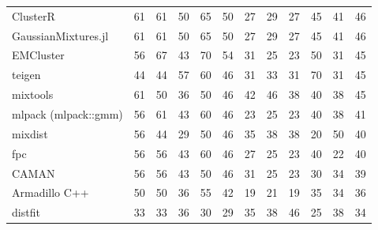 \documentclass[10pt,a4paper]{article}
\begin{document}
{\begin{longtable}{@{}l *{11}{r}@{}}
ClusterR & \cellcolor{hm!48}61 & \cellcolor{hm!48}61 & \cellcolor{hm!40}50 & \cellcolor{hm!50}65 & \cellcolor{hm!40}50 & \cellcolor{hm!24}27 & \cellcolor{hm!25}29 & \cellcolor{hm!24}27 & \cellcolor{hm!36}45 & \cellcolor{hm!33}41 & \cellcolor{hm!37}46 \\
GaussianMixtures.jl & \cellcolor{hm!48}61 & \cellcolor{hm!48}61 & \cellcolor{hm!40}50 & \cellcolor{hm!50}65 & \cellcolor{hm!40}50 & \cellcolor{hm!24}27 & \cellcolor{hm!25}29 & \cellcolor{hm!24}27 & \cellcolor{hm!36}45 & \cellcolor{hm!33}41 & \cellcolor{hm!37}46 \\
EMCluster & \cellcolor{hm!44}56 & \cellcolor{hm!52}67 & \cellcolor{hm!35}43 & \cellcolor{hm!54}70 & \cellcolor{hm!43}54 & \cellcolor{hm!27}31 & \cellcolor{hm!22}25 & \cellcolor{hm!21}23 & \cellcolor{hm!40}50 & \cellcolor{hm!27}31 & \cellcolor{hm!36}45 \\
teigen & \cellcolor{hm!36}44 & \cellcolor{hm!36}44 & \cellcolor{hm!45}57 & \cellcolor{hm!47}60 & \cellcolor{hm!37}46 & \cellcolor{hm!27}31 & \cellcolor{hm!28}33 & \cellcolor{hm!27}31 & \cellcolor{hm!54}70 & \cellcolor{hm!27}31 & \cellcolor{hm!36}45 \\
mixtools & \cellcolor{hm!48}61 & \cellcolor{hm!40}50 & \cellcolor{hm!30}36 & \cellcolor{hm!40}50 & \cellcolor{hm!37}46 & \cellcolor{hm!35}42 & \cellcolor{hm!37}46 & \cellcolor{hm!32}38 & \cellcolor{hm!33}40 & \cellcolor{hm!31}38 & \cellcolor{hm!36}45 \\
mlpack (mlpack::gmm) & \cellcolor{hm!44}56 & \cellcolor{hm!48}61 & \cellcolor{hm!35}43 & \cellcolor{hm!47}60 & \cellcolor{hm!37}46 & \cellcolor{hm!21}23 & \cellcolor{hm!22}25 & \cellcolor{hm!21}23 & \cellcolor{hm!33}40 & \cellcolor{hm!31}38 & \cellcolor{hm!34}41 \\
mixdist & \cellcolor{hm!44}56 & \cellcolor{hm!36}44 & \cellcolor{hm!25}29 & \cellcolor{hm!40}50 & \cellcolor{hm!37}46 & \cellcolor{hm!29}35 & \cellcolor{hm!31}38 & \cellcolor{hm!32}38 & \cellcolor{hm!19}20 & \cellcolor{hm!40}50 & \cellcolor{hm!33}40 \\
fpc & \cellcolor{hm!44}56 & \cellcolor{hm!44}56 & \cellcolor{hm!35}43 & \cellcolor{hm!47}60 & \cellcolor{hm!37}46 & \cellcolor{hm!24}27 & \cellcolor{hm!22}25 & \cellcolor{hm!21}23 & \cellcolor{hm!33}40 & \cellcolor{hm!20}22 & \cellcolor{hm!33}40 \\
CAMAN & \cellcolor{hm!44}56 & \cellcolor{hm!44}56 & \cellcolor{hm!35}43 & \cellcolor{hm!40}50 & \cellcolor{hm!37}46 & \cellcolor{hm!27}31 & \cellcolor{hm!22}25 & \cellcolor{hm!21}23 & \cellcolor{hm!26}30 & \cellcolor{hm!29}34 & \cellcolor{hm!33}39 \\
Armadillo C++ & \cellcolor{hm!40}50 & \cellcolor{hm!40}50 & \cellcolor{hm!30}36 & \cellcolor{hm!44}55 & \cellcolor{hm!34}42 & \cellcolor{hm!18}19 & \cellcolor{hm!20}21 & \cellcolor{hm!18}19 & \cellcolor{hm!30}35 & \cellcolor{hm!29}34 & \cellcolor{hm!30}36 \\
distfit & \cellcolor{hm!28}33 & \cellcolor{hm!28}33 & \cellcolor{hm!30}36 & \cellcolor{hm!26}30 & \cellcolor{hm!25}29 & \cellcolor{hm!29}35 & \cellcolor{hm!31}38 & \cellcolor{hm!37}46 & \cellcolor{hm!22}25 & \cellcolor{hm!31}38 & \cellcolor{hm!29}34 \\
\bottomrule
\end{longtable}}
\end{document}
